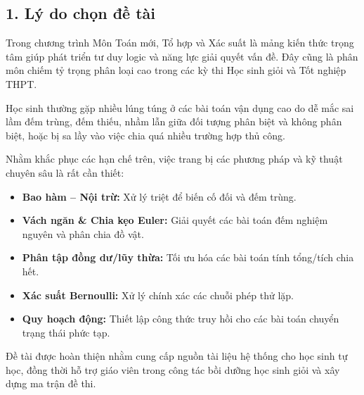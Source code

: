 \documentclass[12pt, a4paper]{article}
\begin{document}
	\subsection*{1. Lý do chọn đề tài}
	
	\indent Trong chương trình Môn Toán mới, Tổ hợp và Xác suất là mảng kiến thức trọng tâm giúp phát triển tư duy logic và năng lực giải quyết vấn đề. Đây cũng là phân môn chiếm tỷ trọng phân loại cao trong các kỳ thi Học sinh giỏi và Tốt nghiệp THPT.
	
	\indent Học sinh thường gặp nhiều lúng túng ở các bài toán vận dụng cao do dễ mắc sai lầm đếm trùng, đếm thiếu, nhầm lẫn giữa đối tượng phân biệt và không phân biệt, hoặc bị sa lầy vào việc chia quá nhiều trường hợp thủ công.
	
	\indent Nhằm khắc phục các hạn chế trên, việc trang bị các phương pháp và kỹ thuật chuyên sâu là rất cần thiết:
	
	\begin{itemize}[leftmargin=*, label=\textcolor{blue}{\textbullet}]
		\item \textbf{Bao hàm -- Nội trừ:} Xử lý triệt để biến cố đối và đếm trùng.
		
		\item \textbf{Vách ngăn \& Chia kẹo Euler:} Giải quyết các bài toán đếm nghiệm nguyên và phân chia đồ vật.
		
		\item \textbf{Phân tập đồng dư/lũy thừa:} Tối ưu hóa các bài toán tính tổng/tích chia hết.
		
		\item \textbf{Xác suất Bernoulli:} Xử lý chính xác các chuỗi phép thử lặp.
		
		\item \textbf{Quy hoạch động:} Thiết lập công thức truy hồi cho các bài toán chuyển trạng thái phức tạp.
	\end{itemize}
	
	\indent Đề tài được hoàn thiện nhằm cung cấp nguồn tài liệu hệ thống cho học sinh tự học, đồng thời hỗ trợ giáo viên trong công tác bồi dưỡng học sinh giỏi và xây dựng ma trận đề thi.
	
\end{document}
